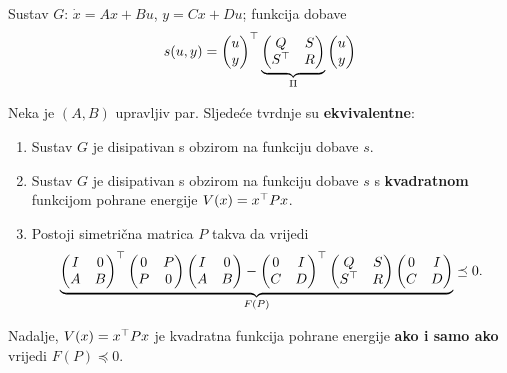 \begin{teorem}
Sustav $G$: $\dot x = Ax + Bu$, $y = Cx + Du$; funkcija dobave
\[
s(u,y) = \begin{pmatrix}u\\y\end{pmatrix}^{\top}
\underbrace{\begin{pmatrix}Q & S\\ S^{\top} & R\end{pmatrix}}_{\Pi}
\begin{pmatrix}u\\y\end{pmatrix}
\]

Neka je $(A,B)$ upravljiv par. Sljedeće tvrdnje su \textbf{ekvivalentne}:
\begin{enumerate}[label=\roman*)]
  \item Sustav $G$ je disipativan s obzirom na funkciju dobave $s$.
  \item Sustav $G$ je disipativan s obzirom na funkciju dobave $s$ s
        \textbf{kvadratnom} funkcijom pohrane energije $V(x) = x^{\top} Px$.
  \item Postoji simetrična matrica $P$ takva da vrijedi
        \[
        \underbrace{
        \begin{pmatrix}I & 0\\ A & B\end{pmatrix}^{\top}
        \begin{pmatrix}0 & P\\ P & 0\end{pmatrix}
        \begin{pmatrix}I & 0\\ A & B\end{pmatrix}
        - \begin{pmatrix}0 & I\\ C & D\end{pmatrix}^{\top}
        \begin{pmatrix}Q & S\\ S^{\top} & R\end{pmatrix}
        \begin{pmatrix}0 & I\\ C & D\end{pmatrix}
        }_{F(P)} \preceq 0.
        \]
\end{enumerate}
Nadalje, $V(x) = x^{\top} Px$ je kvadratna funkcija pohrane energije \textbf{ako i
samo ako} vrijedi $F(P) \preceq 0$.
\end{teorem}

